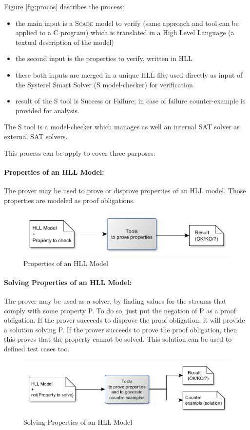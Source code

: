 \documentclass{article}
\newcommand{\smartsolver}{\mbox{S\textsmaller[1]{3}}\xspace}
\newcommand{\SAT}{{SAT}}
\newcommand{\HLL}{{HLL}}
\newcommand{\SCADE}{\textsc{Scade}}
\begin{document}
Figure \ref{fig:procos} describes the process:
\begin{itemize}
\item the main input is a \SCADE{} model to  verify (same approach and tool can be applied to a C program) which is translated in a High Level Language (a textual description of the model)
\item the second input is the properties to verify, written in \HLL{}
\item these both inputs are merged in a unique \HLL{} file, used directly as input of the Systerel Smart Solver (\smartsolver{} model-checker) for verification
\item result of the \smartsolver{} tool is Success or Failure; in case of failure counter-example is provided for analysis.
\end{itemize}

The \smartsolver{} tool is a model-checker which manages as well an internal \SAT{} solver as external \SAT{} solvers.

This process can be apply to cover three purposes:


\paragraph{ Properties of an \HLL{} Model: } The prover may be used to prove or disprove properties of an \HLL{} model. Those properties are modeled as proof obligations.
\begin{figure}[h!]
\centering
\includegraphics[width=1\textwidth]{Use_property_checker}
\caption{Properties of an \HLL{} Model}
\label{fig:proch}
\end{figure}

\paragraph{ Solving Properties of an \HLL{} Model: } The prover may be used as a solver, by finding values for the streams that comply with some property P. To do so, just put the negation of P as a proof obligation. If the prover succeeds to disprove the proof obligation, it will provide a solution solving P. If the prover succeeds to prove the proof obligation, then this proves that the property cannot be solved. This solution can be used to defined test cases too.
\begin{figure}[h!]
\centering
\includegraphics[width=1\textwidth]{Use_property_solver}
\caption{Solving Properties of an \HLL{} Model}
\label{fig:prosolv}
\end{figure}
\end{document}
